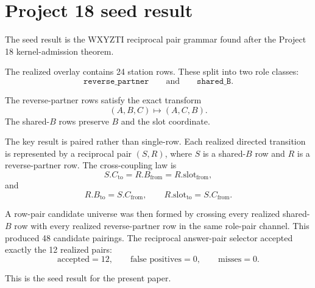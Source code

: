 \section{Project 18 seed result}

The seed result is the WXYZTI reciprocal pair grammar found after the Project 18 kernel-admission theorem.

The realized overlay contains 24 station rows. These split into two role classes:
\[
\texttt{reverse\_partner}
\qquad\text{and}\qquad
\texttt{shared\_B}.
\]

The reverse-partner rows satisfy the exact transform
\[
(A,B,C)\mapsto(A,C,B).
\]
The shared-\(B\) rows preserve \(B\) and the slot coordinate.

The key result is paired rather than single-row. Each realized directed transition is represented by a reciprocal pair \((S,R)\), where \(S\) is a shared-\(B\) row and \(R\) is a reverse-partner row. The cross-coupling law is
\[
S.C_{\mathrm{to}}=R.B_{\mathrm{from}}=R.\mathrm{slot}_{\mathrm{from}},
\]
and
\[
R.B_{\mathrm{to}}=S.C_{\mathrm{from}},
\qquad
R.\mathrm{slot}_{\mathrm{to}}=S.C_{\mathrm{from}}.
\]

A row-pair candidate universe was then formed by crossing every realized shared-\(B\) row with every realized reverse-partner row in the same role-pair channel. This produced 48 candidate pairings. The reciprocal answer-pair selector accepted exactly the 12 realized pairs:
\[
\text{accepted}=12,\qquad
\text{false positives}=0,\qquad
\text{misses}=0.
\]

This is the seed result for the present paper.
